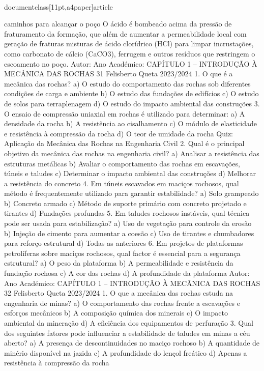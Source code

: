 \\documentclass[11pt,a4paper]{article}
\begin{document}
caminhos para 
alcançar o poço
O ácido é 
bombeado acima 
da pressão de 
fraturamento da 
formação, que 
além de aumentar 
a permeabilidade 
local com geração 
de fraturas
misturas de ácido 
clorídrico (HCl) para 
limpar incrustações, 
como carbonato de 
cálcio (CaCO3), 
ferrugem e outros 
resíduos que 
restringem o 
escoamento no 
poço.
Autor:
Ano Académico:
CAPÍTULO 1 – INTRODUÇÃO À MECÂNICA DAS ROCHAS 31
Felisberto Queta
2023/2024
1. O que é a mecânica das rochas?
a) O estudo do comportamento das rochas sob diferentes condições de carga e ambiente
b) O estudo das fundações de edifícios
c) O estudo de solos para terraplenagem
d) O estudo do impacto ambiental das construções
3. O ensaio de compressão uniaxial em rochas é utilizado para determinar:
a) A densidade da rocha
b) A resistência ao cisalhamento
c) O módulo de elasticidade e resistência à compressão da rocha
d) O teor de umidade da rocha
Quiz: Aplicação da 
Mecânica das 
Rochas na 
Engenharia Civil
2. Qual é o principal objetivo da mecânica das rochas na engenharia civil?
a) Analisar a resistência das estruturas metálicas
b) Avaliar o comportamento das rochas em escavações, túneis e taludes
c) Determinar o impacto ambiental das construções
d) Melhorar a resistência do concreto
4. Em túneis escavados em maciços rochosos, qual método é frequentemente utilizado para garantir estabilidade?
a) Solo grampeado
b) Concreto armado
c) Método de suporte primário com concreto projetado e tirantes
d) Fundações profundas
5. Em taludes rochosos instáveis, qual técnica pode ser usada para estabilização?
a) Uso de vegetação para controle da erosão
b) Injeção de cimento para aumentar a coesão
c) Uso de tirantes e chumbadores para reforço estrutural
d) Todas as anteriores
6. Em projetos de plataformas petrolíferas sobre maciços rochosos, qual factor é essencial para a segurança estrutural?
a) O peso da plataforma
b) A permeabilidade e resistência da fundação rochosa
c) A cor das rochas
d) A profundidade da plataforma
Autor:
Ano Académico:
CAPÍTULO 1 – INTRODUÇÃO À MECÂNICA DAS ROCHAS 32
Felisberto Queta
2023/2024
1. O que a mecânica das rochas estuda na engenharia de minas?
a) O comportamento das rochas frente a escavações e esforços mecânicos
b) A composição química dos minerais
c) O impacto ambiental da mineração
d) A eficiência dos equipamentos de perfuração
3. Qual dos seguintes fatores pode influenciar a estabilidade de taludes em minas a céu aberto?
a) A presença de descontinuidades no maciço rochoso
b) A quantidade de minério disponível na jazida
c) A profundidade do lençol freático
d) Apenas a resistência à compressão da rocha
\end{document}
